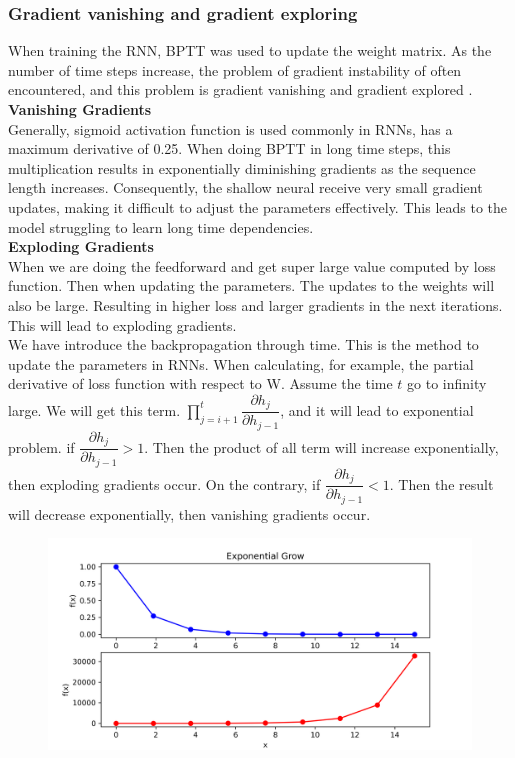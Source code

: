 \documentclass[12pt,a4paper]{article}
\begin{document}
\subsubsection{Gradient vanishing and gradient exploring}
When training the RNN, BPTT was used to update the weight matrix. As the number of time steps increase, the problem of gradient instability of often encountered, and this problem is gradient vanishing and gradient explored \parencite{bengio1994learning}. 
\\[2ex]
\textbf{Vanishing Gradients}
\\[1ex]
Generally, sigmoid activation function is used commonly in RNNs, has a maximum derivative of 0.25. When doing BPTT in long time steps, this multiplication results in exponentially diminishing gradients as the sequence length increases. Consequently, the shallow neural receive very small gradient updates, making it difficult to adjust the parameters effectively. This leads to the model struggling to learn long time dependencies. 
\\[1ex]
\textbf{Exploding Gradients}
\\[1ex]
When we are doing the feedforward and get super large value computed by loss function. Then when updating the parameters. The updates to the weights will also be large. Resulting in higher loss and larger gradients in the next iterations. This will lead to exploding gradients.
\\[1ex]
We have introduce the backpropagation through time. This is the method to update the parameters in RNNs. When calculating, for example, the partial derivative of loss function with respect to W. Assume the time $t$ go to infinity large. We will get this term. $ \prod_{j=i+1}^{t} \dfrac{\partial h_j}{\partial h_{j-1}} $, and it will lead to exponential problem. if $ \dfrac{\partial h_j}{\partial h_{j-1}} > 1 $. Then the product of all term will increase exponentially, then exploding gradients occur. On the contrary, if $\dfrac{\partial h_j}{\partial h_{j-1}} < 1$. Then the result will decrease exponentially, then vanishing gradients occur.
\begin{figure}[!htb]
    \centering
    \includegraphics[width=1\textwidth]{../Pic/exponential_growth.png} %
\end{figure}
\end{document}
